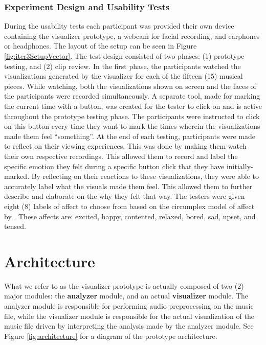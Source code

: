 \documentclass{sigchi-ext}
\begin{document}
\subsubsection{Experiment Design and Usability Tests}
During the usability tests each participant was provided their own device containing the visualizer prototype, a webcam for facial recording, and earphones or headphones. The layout of the setup can be seen in Figure \ref{fig:iter3SetupVector}. The test design consisted of two phases: (1) prototype testing, and (2) clip review. In the first phase, the participants watched the visualizations generated by the visualizer for each of the fifteen (15) musical pieces. While watching, both the visualizations shown on screen and the faces of the participants were recorded simultaneously. A separate tool, made for marking the current time with a button, was created for the tester to click on and is active throughout the prototype testing phase. The participants were instructed to click on this button every time they want to mark the times wherein the visualizations made them feel ``something''. At the end of each testing, participants were made to reflect on their viewing experiences. This was done by making them watch their own respective recordings. This allowed them to record and label the specific emotion they felt during a specific button click that they have initially-marked. By reflecting on their reactions to these visualizations, they were able to accurately label what the visuals made them feel. This allowed them to further describe and elaborate on the why they felt that way. The testers were given eight (8) labels of affect to choose from based on the circumplex model of affect by \cite{Russel:1980}. These affects are: excited, happy, contented, relaxed, bored, sad, upset, and tensed.



\section{Architecture}
What we refer to as the visualizer prototype is actually composed of two (2) major modules: the \textbf{analyzer} module, and an actual \textbf{visualizer} module. The analyzer module is responsible for performing audio preprocessing on the music file, while the visualizer module is responsible for the actual visualization of the music file driven by interpreting the analysis made by the analyzer module. See Figure \ref{fig:architecture} for a diagram of the prototype architecture.
\end{document}
